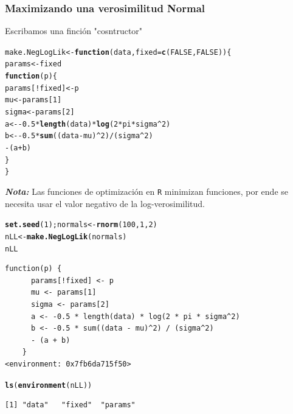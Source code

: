 \documentclass{article}\usepackage[]{graphicx}\usepackage[]{color}
\makeatletter
\newcommand{\hlnum}[1]{\textcolor[rgb]{0.686,0.059,0.569}{#1}}%
\newcommand{\hlopt}[1]{\textcolor[rgb]{0,0,0}{#1}}%
\newcommand{\hlstd}[1]{\textcolor[rgb]{0.345,0.345,0.345}{#1}}%
\newcommand{\hlkwa}[1]{\textcolor[rgb]{0.161,0.373,0.58}{\textbf{#1}}}%
\newcommand{\hlkwb}[1]{\textcolor[rgb]{0.69,0.353,0.396}{#1}}%
\newcommand{\hlkwc}[1]{\textcolor[rgb]{0.333,0.667,0.333}{#1}}%
\newcommand{\hlkwd}[1]{\textcolor[rgb]{0.737,0.353,0.396}{\textbf{#1}}}%
\newenvironment{kframe}{%
 \def\at@end@of@kframe{}%
 \ifinner\ifhmode%
  \def\at@end@of@kframe{\end{minipage}}%
  \begin{minipage}{\columnwidth}%
 \fi\fi%
 \def\FrameCommand##1{\hskip\@totalleftmargin \hskip-\fboxsep
 \colorbox{shadecolor}{##1}\hskip-\fboxsep
     \hskip-\linewidth \hskip-\@totalleftmargin \hskip\columnwidth}%
 \MakeFramed {\advance\hsize-\width
   \@totalleftmargin\z@ \linewidth\hsize
   \@setminipage}}%
 {\par\unskip\endMakeFramed%
 \at@end@of@kframe}
\newenvironment{knitrout}{}{} %
\makeatother
\begin{document}
  \subsubsection{Maximizando una verosimilitud Normal}
  Escribamos una finción "cosntructor"
\begin{knitrout}
\color{fgcolor}\begin{kframe}
\begin{alltt}
  \hlstd{make.NegLogLik} \hlkwb{<-} \hlkwa{function}\hlstd{(}\hlkwc{data}\hlstd{,} \hlkwc{fixed}\hlstd{=}\hlkwd{c}\hlstd{(}\hlnum{FALSE}\hlstd{,} \hlnum{FALSE}\hlstd{)) \{}
    \hlstd{params} \hlkwb{<-} \hlstd{fixed}
    \hlkwa{function}\hlstd{(}\hlkwc{p}\hlstd{) \{}
      \hlstd{params[}\hlopt{!}\hlstd{fixed]} \hlkwb{<-} \hlstd{p}
      \hlstd{mu} \hlkwb{<-} \hlstd{params[}\hlnum{1}\hlstd{]}
      \hlstd{sigma} \hlkwb{<-} \hlstd{params[}\hlnum{2}\hlstd{]}
      \hlstd{a} \hlkwb{<-} \hlopt{-}\hlnum{0.5} \hlopt{*} \hlkwd{length}\hlstd{(data)} \hlopt{*} \hlkwd{log}\hlstd{(}\hlnum{2} \hlopt{*} \hlstd{pi} \hlopt{*} \hlstd{sigma}\hlopt{^}\hlnum{2}\hlstd{)}
      \hlstd{b} \hlkwb{<-} \hlopt{-}\hlnum{0.5} \hlopt{*} \hlkwd{sum}\hlstd{((data} \hlopt{-} \hlstd{mu)}\hlopt{^}\hlnum{2}\hlstd{)} \hlopt{/} \hlstd{(sigma}\hlopt{^}\hlnum{2}\hlstd{)}
      \hlopt{-} \hlstd{(a} \hlopt{+} \hlstd{b)}
    \hlstd{\}}
  \hlstd{\}}
\end{alltt}
\end{kframe}
\end{knitrout}
  \textbf{\emph{Nota:}} Las funciones de optimización en \texttt{R} minimizan funciones, por ende se necesita usar el valor negativo de la log-verosimilitud.
\begin{knitrout}
\color{fgcolor}\begin{kframe}
\begin{alltt}
  \hlkwd{set.seed}\hlstd{(}\hlnum{1}\hlstd{); normals} \hlkwb{<-} \hlkwd{rnorm}\hlstd{(}\hlnum{100}\hlstd{,} \hlnum{1}\hlstd{,} \hlnum{2}\hlstd{)}
  \hlstd{nLL} \hlkwb{<-} \hlkwd{make.NegLogLik}\hlstd{(normals)}
  \hlstd{nLL}
\end{alltt}
\begin{verbatim}
function(p) {
      params[!fixed] <- p
      mu <- params[1]
      sigma <- params[2]
      a <- -0.5 * length(data) * log(2 * pi * sigma^2)
      b <- -0.5 * sum((data - mu)^2) / (sigma^2) 
      - (a + b)
    }
<environment: 0x7fb6da715f50>
\end{verbatim}
\begin{alltt}
  \hlkwd{ls}\hlstd{(}\hlkwd{environment}\hlstd{(nLL))}
\end{alltt}
\begin{verbatim}
[1] "data"   "fixed"  "params"
\end{verbatim}
\end{kframe}
\end{knitrout}
\end{document}
